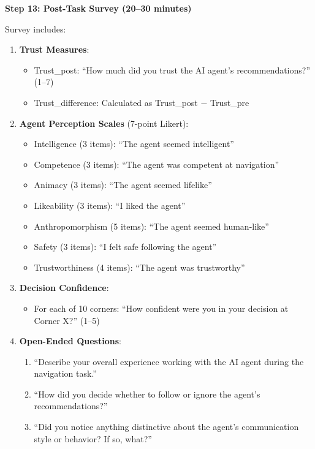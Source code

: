 \documentclass[12pt]{article}
\begin{document}
\textbf{Step 13: Post-Task Survey (20--30 minutes)}

Survey includes:

\begin{enumerate}
    \item \textbf{Trust Measures}:
    \begin{itemize}
        \item Trust\_post: ``How much did you trust the AI agent's recommendations?'' (1--7)
        \item Trust\_difference: Calculated as Trust\_post $-$ Trust\_pre
    \end{itemize}
    
    \item \textbf{Agent Perception Scales} (7-point Likert):
    \begin{itemize}
        \item Intelligence (3 items): ``The agent seemed intelligent''
        \item Competence (3 items): ``The agent was competent at navigation''
        \item Animacy (3 items): ``The agent seemed lifelike''
        \item Likeability (3 items): ``I liked the agent''
        \item Anthropomorphism (5 items): ``The agent seemed human-like''
        \item Safety (3 items): ``I felt safe following the agent''
        \item Trustworthiness (4 items): ``The agent was trustworthy''
    \end{itemize}
    
    \item \textbf{Decision Confidence}:
    \begin{itemize}
        \item For each of 10 corners: ``How confident were you in your decision at Corner X?'' (1--5)
    \end{itemize}
    
    \item \textbf{Open-Ended Questions}:
    \begin{enumerate}
        \item ``Describe your overall experience working with the AI agent during the navigation task.''
        \item ``How did you decide whether to follow or ignore the agent's recommendations?''
        \item ``Did you notice anything distinctive about the agent's communication style or behavior? If so, what?''
    \end{enumerate}
    

\end{enumerate}
\end{document}
